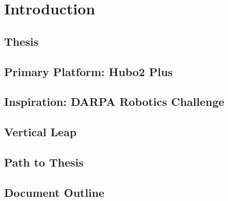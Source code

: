 \chapter{Introduction}
	\section{Thesis} %
		
	\section{Primary Platform: Hubo2 Plus}\label{sec:hubo}
			
	\section{Inspiration: DARPA Robotics Challenge}\label{sec:drc}
    		
    \section{Vertical Leap}
		
	\section{Path to Thesis}\label{sec:roadmap}	
			
	\section{Document Outline} 
	
			
